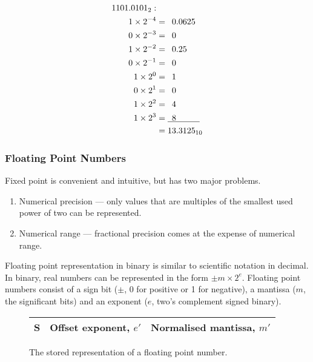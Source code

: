 \begin{align*}
  {1101.0101}_{2} : & \\
  1 \times 2 ^ {-4} &=            \hphantom{0}0.0625              \\
  0 \times 2 ^ {-3} &=            \hphantom{0}0                   \\
  1 \times 2 ^ {-2} &=            \hphantom{0}0.25                \\
  0 \times 2 ^ {-1} &=            \hphantom{0}0                   \\
  1 \times 2 ^   0  &=            \hphantom{0}1                   \\
  0 \times 2 ^   1  &=            \hphantom{0}0                   \\
  1 \times 2 ^   2  &=            \hphantom{0}4                   \\
  1 \times 2 ^   3  &= \underline{\hphantom{0}8\hphantom{.00000}} \\
                    &=           {\hphantom{}13.3125}_{10}        \\
\end{align*}

\subsubsection{Floating Point Numbers}

Fixed point is convenient and intuitive, but has two major problems.
\begin{enumerate}
  \item Numerical precision --- only values that are multiples of the smallest used power of two can be represented.
  \item Numerical range --- fractional precision comes at the expense of numerical range.
\end{enumerate}

Floating point representation in binary is similar to scientific notation in decimal.
In binary, real numbers can be represented in the form \( \pm m \times 2 ^ e \).
Floating point numbers consist of a sign bit (\( \pm \), \num{0} for positive or \num{1} for negative), a mantissa (\( m \), the significant bits) and an exponent (\( e \), two's complement signed binary).

\begin{figure}[htp]
  \centering
  \begin{tabular}{|c|c|c|}
    \hline
    S & Offset exponent, \( e' \) & Normalised mantissa, \( m' \) \\
    \hline
  \end{tabular}
  \caption*{The stored representation of a floating point number.}
\end{figure}

